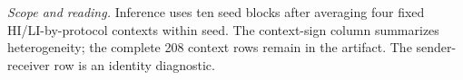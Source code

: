 \noindent\footnotesize\emph{Scope and reading.} Inference uses ten seed blocks after averaging four fixed HI/LI-by-protocol contexts within seed. The context-sign column summarizes heterogeneity; the complete 208 context rows remain in the artifact. The sender-receiver row is an identity diagnostic.\par
\endgroup
